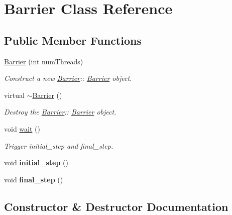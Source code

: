 \hypertarget{classBarrier}{}\section{Barrier Class Reference}
\label{classBarrier}
\subsection*{Public Member Functions}
\begin{DoxyCompactItemize}
\item 
\hyperlink{classBarrier_a7290fb8952d0f7779b8d6a7a34bbd407}{Barrier} (int num\+Threads)
\begin{DoxyCompactList}\small\item\em Construct a new \hyperlink{classBarrier}{Barrier}\+:\+: \hyperlink{classBarrier}{Barrier} object. \end{DoxyCompactList}\item 
\mbox{\label{classBarrier_a401f40e73302009b305904ffc7825304}} 
virtual \hyperlink{classBarrier_a401f40e73302009b305904ffc7825304}{$\sim$\+Barrier} ()
\begin{DoxyCompactList}\small\item\em Destroy the \hyperlink{classBarrier}{Barrier}\+:\+: \hyperlink{classBarrier}{Barrier} object. \end{DoxyCompactList}\item 
\mbox{\label{classBarrier_a83a9d2e85e98b3d2081538bf0da29b60}} 
void \hyperlink{classBarrier_a83a9d2e85e98b3d2081538bf0da29b60}{wait} ()
\begin{DoxyCompactList}\small\item\em Trigger initial\+\_\+step and final\+\_\+step. \end{DoxyCompactList}\item 
\mbox{\label{classBarrier_a956fbdd767ce55f03dcaebfd333a7bb2}} 
void {\bfseries initial\+\_\+step} ()
\item 
\mbox{\label{classBarrier_a3dff1213f1e26ca8ce8c62fa18e1735b}} 
void {\bfseries final\+\_\+step} ()
\end{DoxyCompactItemize}


\subsection{Constructor \& Destructor Documentation}
\mbox{\label{classBarrier_a7290fb8952d0f7779b8d6a7a34bbd407}} 
